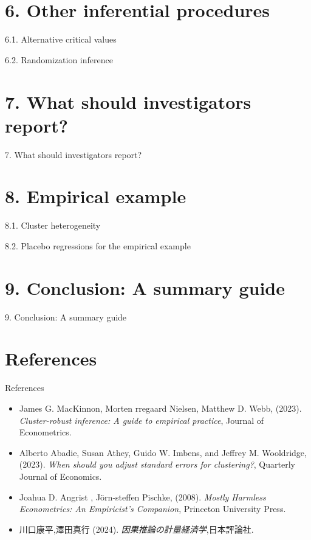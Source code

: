 \documentclass[xcolor=svgnames,aspectratio=169]{beamer}
\begin{document}
\section{6. Other inferential procedures}

\begin{frame}{6.1. Alternative critical values}
\end{frame}

\begin{frame}{6.2. Randomization inference}
\end{frame}

\section{7. What should investigators report?}

\begin{frame}{7. What should investigators report?}
\end{frame}

\section{8. Empirical example}

\begin{frame}{8.1. Cluster heterogeneity}
\end{frame}

\begin{frame}{8.2. Placebo regressions for the empirical example}
\end{frame}

\section{9. Conclusion: A summary guide}

\begin{frame}{9. Conclusion: A summary guide}
\end{frame}

\section{References}

\begin{frame}{References}
    \begin{itemize}
        \item James G. MacKinnon, Morten rregaard Nielsen, Matthew D. Webb, (2023). 
        \textit{Cluster-robust inference: A guide to empirical practice}, Journal of Econometrics.
        \item Alberto Abadie, Susan Athey, Guido W. Imbens, and Jeffrey M. Wooldridge, (2023).
        \textit{When should you adjust standard errors for clustering?}, Quarterly Journal of Economics.
        \item Joahua D. Angrist , J\"{o}rn-steffen Pischke, (2008).
        \textit{Mostly Harmless Econometrics: An Empiricist's Companion}, Princeton University Press.
        \item 川口康平,澤田真行 (2024). 
        \textit{因果推論の計量経済学},日本評論社.
    \end{itemize}
\end{frame}
\end{document}

